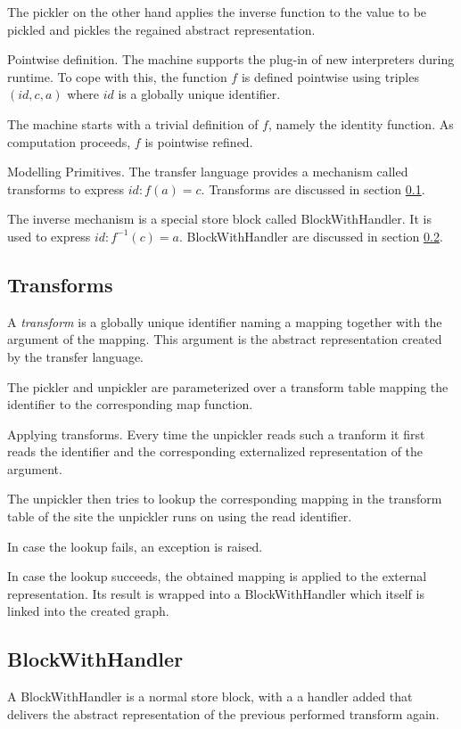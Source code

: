 The pickler on the other hand
applies the inverse function to the value to be pickled
and pickles the regained abstract representation.
\begin{paragraph}{Pointwise definition.}
The machine supports the plug-in of new interpreters during runtime.
To cope with this, the function $f$ is defined
pointwise using triples $(id, c, a)$ where $id$
is a globally unique identifier.

The machine starts with a trivial definition of $f$, namely the identity
function. As computation proceeds, $f$ is pointwise refined.
\end{paragraph}
\begin{paragraph}{Modelling Primitives.}
The transfer language provides a mechanism called transforms to express
$id: f(a) = c$. Transforms are discussed in section \ref{transform_sect}.

The inverse mechanism is a special store block called BlockWithHandler.
It is used to express $id: f^{-1}(c) = a$.
BlockWithHandler are discussed in section \ref{blockhandler_sect}.
\end{paragraph}
\subsection{Transforms}
\label{transform_sect}
A {\em transform} is a globally unique identifier naming a
mapping together with the argument of the mapping.
This argument is the abstract representation created by the transfer
language.

The pickler and unpickler are parameterized over a transform table
mapping the identifier to the corresponding map function.
\begin{paragraph}{Applying transforms.}
Every time the unpickler reads such a tranform it first reads
the identifier and the corresponding externalized representation
of the argument.

The unpickler then tries to lookup
the corresponding mapping in the transform table of the site the unpickler
runs on using the read identifier.

In case the lookup fails, an exception is raised.

In case the lookup succeeds, the obtained mapping is applied to the external
representation.
Its result is wrapped into a BlockWithHandler which itself
is linked into the created graph.
\end{paragraph}
\subsection{BlockWithHandler}
\label{blockhandler_sect}
A BlockWithHandler is a normal store block, with a a handler added
that delivers the abstract representation of the previous performed
transform again.


